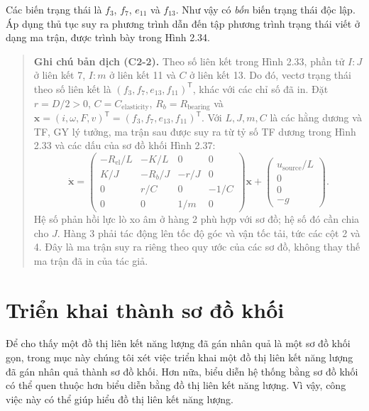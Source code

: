 Các biến trạng thái là $f_3$, $f_7$, $e_{11}$ và $f_{13}$. Như vậy có \emph{bốn} biến trạng thái độc lập. Áp dụng thủ tục suy ra phương trình dẫn đến tập phương trình trạng thái viết ở dạng ma trận, được trình bày trong Hình 2.34.
\clearpage
\begin{quote}\begin{minipage}{\linewidth}\small
\textbf{Ghi chú bản dịch (C2-2).} Theo số liên kết trong Hình 2.33, phần tử $I:J$ ở liên kết 7, $I:m$ ở liên kết 11 và $C$ ở liên kết 13. Do đó, vectơ trạng thái theo số liên kết là $(f_3,f_7,e_{13},f_{11})^{\mathsf{T}}$, khác với các chỉ số đã in. Đặt $r=D/2>0$, $C=C_{\mathrm{elasticity}}$, $R_b=R_{\mathrm{bearing}}$ và $\mathbf{x}=(i,\omega,F,v)^{\mathsf{T}}=(f_3,f_7,e_{13},f_{11})^{\mathsf{T}}$. Với $L,J,m,C$ là các hằng dương và TF, GY lý tưởng, ma trận sau được suy ra từ tỷ số TF dương trong Hình 2.33 và các dấu của sơ đồ khối Hình 2.37:
\[
\dot{\mathbf{x}}=
\begin{pmatrix}
-R_{\mathrm{el}}/L & -K/L & 0 & 0\\
K/J & -R_b/J & -r/J & 0\\
0 & r/C & 0 & -1/C\\
0 & 0 & 1/m & 0
\end{pmatrix}\mathbf{x}
+\begin{pmatrix}u_{\mathrm{source}}/L\\0\\0\\-g\end{pmatrix}.
\]
Hệ số phản hồi lực lò xo âm ở hàng 2 phù hợp với sơ đồ; hệ số đó cần chia cho $J$. Hàng 3 phải tác động lên tốc độ góc và vận tốc tải, tức các cột 2 và 4. Đây là ma trận suy ra riêng theo quy ước của các sơ đồ, không thay thế ma trận đã in của tác giả.
\end{minipage}\end{quote}

\section{Triển khai thành sơ đồ khối}
Để cho thấy một đồ thị liên kết năng lượng đã gán nhân quả là một sơ đồ khối gọn, trong mục này chúng tôi xét việc triển khai một đồ thị liên kết năng lượng đã gán nhân quả thành sơ đồ khối. Hơn nữa, biểu diễn hệ thống bằng sơ đồ khối có thể quen thuộc hơn biểu diễn bằng đồ thị liên kết năng lượng. Vì vậy, công việc này có thể giúp hiểu đồ thị liên kết năng lượng.

